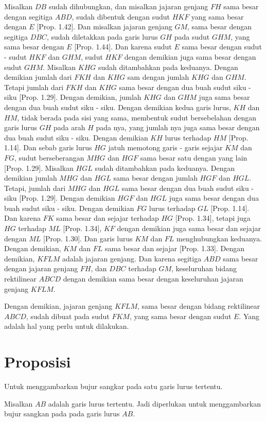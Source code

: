 \documentclass[a4paper]{book}
\begin{document}
Misalkan $DB$ sudah dihubungkan, dan misalkan jajaran genjang $FH$ sama 
besar dengan segitiga $ABD$, sudah dibentuk dengan sudut $HKF$ yang sama
besar dengan $E$ [Prop. 1.42]. Dan misalkan jajaran genjang $GM$, sama besar
dengan segitiga $DBC$, sudah diletakkan pada garis lurus $GH$ pada sudut
$GHM$, yang sama besar dengan $E$ [Prop. 1.44]. Dan karena sudut $E$ sama 
besar dengan sudut - sudut $HKF$ dan $GHM$, sudut $HKF$ dengan demikian
juga sama besar dengan sudut $GHM$. Misalkan $KHG$ sudah ditambahkan pada
keduanya. Dengan demikian jumlah dari $FKH$ dan $KHG$ sam dengan jumlah
$KHG$ dan $GHM$. Tetapi jumlah dari $FKH$ dan $KHG$ sama besar dengan dua
buah sudut siku - siku [Prop. 1.29]. Dengan demikian, jumlah $KHG$ dan $GHM$
juga sama besar dengan dua buah sudut siku - siku. Dengan demikian kedua 
garis lurus, $KH$ dan $HM$, tidak berada pada sisi yang sama, membentuk
sudut bersebelahan dengan garis lurus $GH$ pada arah $H$ pada nya, yang jumlah
nya juga sama besar dengan dua buah sudut siku - siku. Dengan demikian
$KH$ lurus terhadap $HM$ [Prop. 1.14]. Dan sebab garis lurus $HG$ jatuh
memotong garis - garis sejajar  $KM$ dan $FG$, sudut berseberangan $MHG$ dan
$HGF$ sama besar satu dengan yang lain [Prop. 1.29]. Misalkan $HGL$ sudah
ditambahkan pada keduanya. Dengan demikian jumlah $MHG$ dan $HGL$ sama besar
dengan jumlah $HGF$ dan $HGL$. Tetapi, jumlah dari $MHG$ dan $HGL$ sama
besar dengan dua buah sudut siku - siku [Prop. 1.29]. Dengan demikian
$HGF$ dan $HGL$ juga sama besar dengan dua buah sudut siku - siku. Dengan
demikian $FG$ lurus terhadap $GL$ [Prop. 1.14]. Dan karena $FK$ sama besar dan 
sejajar terhadap $HG$ [Prop. 1.34], tetapi juga $HG$ terhadap $ML$ 
[Prop. 1.34], $KF$ dengan demikian juga sama besar dan sejajar dengan
$ML$ [Prop. 1.30]. Dan garis lurus $KM$ dan $FL$ menghubungkan keduanya.
Dengan demikian, $KM$ dan $FL$ sama besar dan sejajar [Prop. 1.33]. 
Dengan demikian, $KFLM$ adalah jajaran genjang. Dan karena segitiga 
$ABD$ sama besar dengan jajaran genjang $FH$, dan $DBC$ terhadap
$GM$, keseluruhan bidang rektilinear $ABCD$ dengan demikian sama
besar dengan keseluruhan jajaran genjang $KFLM$.

Dengan demikian, jajaran genjang $KFLM$, sama besar dengan bidang
rektilinear $ABCD$, sudah dibuat pada sudut $FKM$, yang sama besar
dengan sudut $E$. Yang adalah hal yang perlu untuk dilakukan.

\section*{\centering Proposisi \thesection} 
Untuk menggambarkan bujur sangkar pada satu garis lurus tertentu.
\begin{center}
\end{center}
Misalkan $AB$ adalah garis lurus tertentu. Jadi diperlukan untuk menggambarkan
bujur sangkan pada pada garis lurus $AB$.
\end{document}
